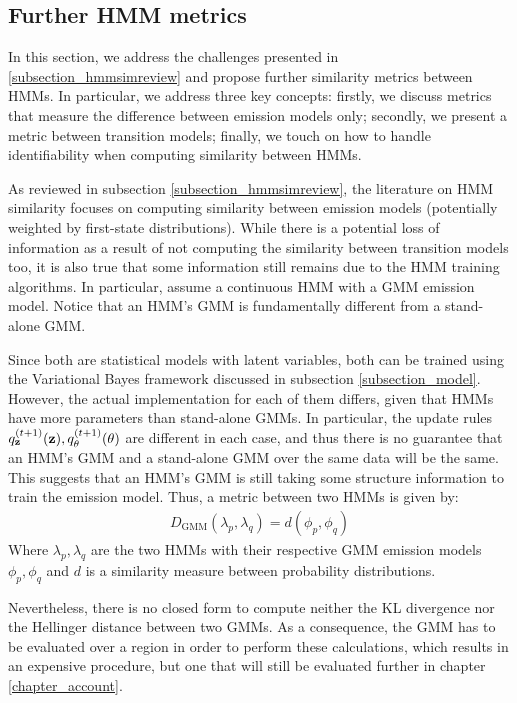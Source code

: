 \documentclass[../main.tex]{subfiles}
\begin{document}
\subsection{Further HMM metrics} \label{subsection_hmmsim}
In this section, we address the challenges presented in \ref{subsection_hmmsimreview} and propose further similarity metrics between HMMs. In particular, we address three key concepts: firstly, we discuss metrics that measure the difference between emission models only; secondly, we present a metric between transition models; finally, we touch on how to handle identifiability when computing similarity between HMMs.
\par As reviewed in subsection \ref{subsection_hmmsimreview}, the literature on HMM similarity focuses on computing similarity between emission models (potentially weighted by first-state distributions). While there is a potential loss of information as a result of not computing the similarity between transition models too, it is also true that some information still remains due to the HMM training algorithms. In particular, assume a continuous HMM with a GMM emission model. Notice that an HMM's GMM is fundamentally different from a stand-alone GMM.
\par Since both are statistical models with latent variables, both can be trained using the Variational Bayes framework discussed in subsection \ref{subsection_model}. However, the actual implementation for each of them differs, given that HMMs have more parameters than stand-alone GMMs. In particular, the update rules $q_{\mathbf{z}}^{(t+1)}(\mathbf{z}), q_{\theta}^{(t+1)}(\theta)$ are different in each case, and thus there is no guarantee that an HMM's GMM and a stand-alone GMM over the same data will be the same. This suggests that an HMM's GMM is still taking some structure information to train the emission model. Thus, a metric between two HMMs is given by:
\begin{align*}
D_{\text{GMM}}(\lambda_p, \lambda_q) = d( \phi_p, \phi_q )
\end{align*}
Where $\lambda_p, \lambda_q$ are the two HMMs with their respective GMM emission models $\phi_p, \phi_q$ and $d$ is a similarity measure between probability distributions.
\par Nevertheless, there is no closed form to compute neither the KL divergence nor the Hellinger distance between two GMMs. As a consequence, the GMM has to be evaluated over a region in order to perform these calculations, which results in an expensive procedure, but one that will still be evaluated further in chapter \ref{chapter_account}. 
\end{document}
